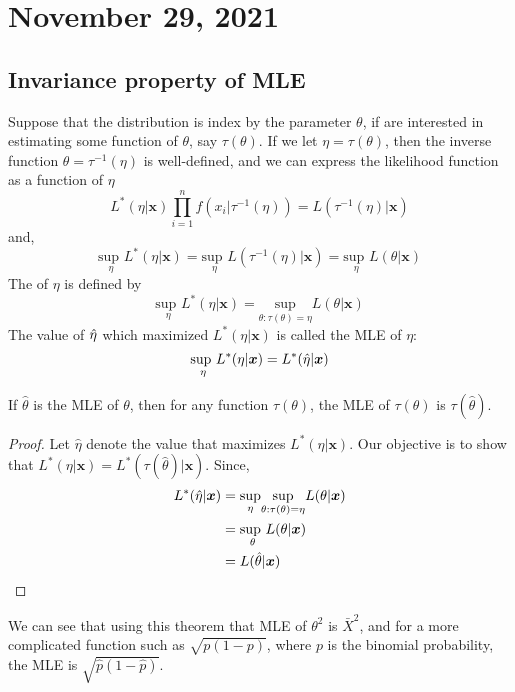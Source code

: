 \section{November 29, 2021}
\subsection{Invariance property of MLE}
Suppose that the distribution is index by the parameter $\theta$, if are interested in estimating some function of $\theta$, say $\tau(\theta)$.
If we let $\eta = \tau(\theta)$, then the inverse function $\theta = \tau^{-1}(\eta)$ is well-defined, and we can express the likelihood function as a function of $\eta$
$$
L^{*}(\eta|\boldsymbol{x}) \prod_{i=1}^{n}f(x_i|\tau^{-1}(\eta)) = L(\tau^{-1}(\eta)|\boldsymbol{x})
$$
and,
$$
\underset{\eta}{\text{sup }}L^{*}(\eta|\boldsymbol{x}) = \underset{\eta}{\text{sup }}L(\tau^{-1}(\eta)|\boldsymbol{x})
= \underset{\eta}{\text{sup }}L(\theta|\boldsymbol{x})
$$ 
The  of $\eta$ is defined by 
$$
\underset{\eta}{\text{sup }}L^{*}(\eta|\boldsymbol{x}) =
\underset{\theta: \tau(\theta) = \eta}{\text{sup}}L(\theta|\boldsymbol{x})
$$
The value of $\Hat{\eta}$ which maximized $L^{*}(\eta|\boldsymbol{x})$ is called the MLE of $\eta$:
$$
\underset{\eta}{\text{sup }}L^{*}(\eta|\boldsymbol{x}) =L^{*}(\Hat{\eta}|\boldsymbol{x})
$$
\begin{theorem}
    If $\hat{\theta}$ is the MLE of $\theta$, then for any function $\tau(\theta)$, the MLE of $\tau(\theta)$ is $\tau(\hat{\theta})$.
\end{theorem}
\begin{proof}
    Let $\hat{\eta}$ denote the value that maximizes $L^{*}(\eta|\boldsymbol{x})$. Our objective is to show that $L^{*}(\eta|\boldsymbol{x}) = L^{*}(\tau(\hat{\theta})|\boldsymbol{x})$. Since,
    \begin{align*}
        L^{*}(\hat{\eta}|\boldsymbol{x}) &= \underset{\eta}{\text{sup}}
        \underset{\Large \theta: \tau(\theta) = \eta}{\text{sup}} L(\theta|\boldsymbol{x})\\
        &= \underset{\theta}{\text{sup }}L(\theta|\boldsymbol{x}) \\ 
        & = L(\hat{\theta}|\boldsymbol{x})
    \end{align*}
\end{proof}
We can see that using this theorem that MLE of $\theta^2$ is $\bar{X}^2$, and for a more complicated function such as $\sqrt{p(1-p)}$, where $p$ is the binomial probability, the MLE is $\sqrt{\hat{p}(1-\hat{p} )}$.
